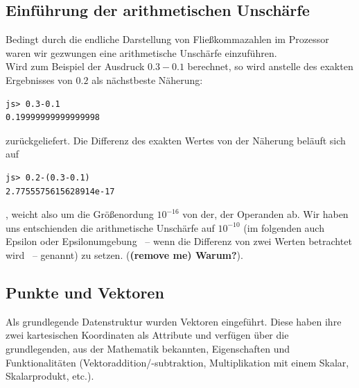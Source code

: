 \documentclass[a4paper,twocolumn]{scrartcl}
\begin{document}
\subsection{Einführung der arithmetischen Unschärfe}
Bedingt durch die endliche Darstellung von Flie\ss kommazahlen im Prozessor waren wir gezwungen eine arithmetische
Unsch\"arfe einzuf\"uhren. \\
Wird zum Beispiel der Ausdruck $0.3-0.1$ berechnet, so wird anstelle des exakten Ergebnisses von $0.2$ 
als n\"achstbeste  Näherung:
\begin{lstlisting}
js> 0.3-0.1
0.19999999999999998
\end{lstlisting}
zur\"uckgeliefert. Die Differenz des exakten Wertes von der N\"aherung bel\"auft sich auf
\begin{lstlisting}
js> 0.2-(0.3-0.1)
2.7755575615628914e-17
\end{lstlisting}
, weicht also um die Gr\"o\ss enordung $10^{-16}$ von der, der Operanden ab.
Wir haben uns entschienden die arithmetische Unsch\"arfe auf $10^{-10}$ (im folgenden auch Epsilon oder Epsilonumgebung ~-- wenn die Differenz von zwei Werten betrachtet wird ~-- genannt) zu setzen. (\textbf{(remove me) Warum?}).
\subsection{Punkte und Vektoren}
Als grundlegende Datenstruktur wurden Vektoren eingef\"uhrt. Diese haben ihre zwei kartesischen Koordinaten als
Attribute und verf\"ugen \"uber die grundlegenden, aus der Mathematik bekannten, Eigenschaften und Funktionalit\"aten
(Vektoraddition/-subtraktion,
Multiplikation mit einem Skalar, Skalarprodukt, etc.).
\end{document}
